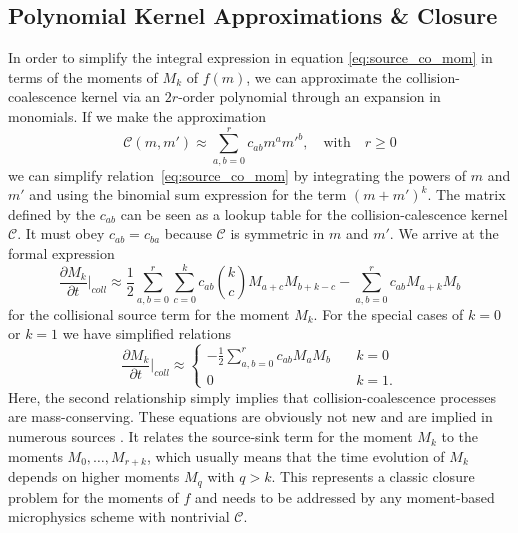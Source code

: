\documentclass{report}
\begin{document}
\subsection{Polynomial Kernel Approximations \& Closure}
In order to simplify the integral expression in equation \eqref{eq:source_co_mom} in terms of the moments of $M_k$ of $f(m)$, we can approximate the collision-coalescence kernel via an $2r$-order polynomial through an expansion in monomials. If we make the approximation
\begin{equation}
    \mathcal{C}(m,m') \approx \sum_{a,b=0}^{r} c_{ab} m^a{m'}^b, \quad \text{with} \quad r \geq 0
\label{eq:dist_approx}
\end{equation} 
we can simplify relation~\eqref{eq:source_co_mom} by integrating the powers of $m$ and $m'$ and using the binomial sum expression for the term $(m+m')^k$. The matrix defined by the $c_{ab}$ can be seen as a lookup table for the collision-calescence kernel $\mathcal{C}$. It must obey $c_{ab} = c_{ba}$ because $\mathcal{C}$ is symmetric in $m$ and $m'$. We arrive at the formal expression
\begin{equation}
\frac{\partial M_k}{\partial t} \biggr\rvert_{coll} \approx
    \frac{1}{2} \sum_{a,b=0}^{r} \sum_{c=0}^k c_{ab} {k \choose c} M_{a+c} M_{b+k-c} - \sum_{a,b=0}^{r} c_{ab} M_{a+k} M_b
\label{eq:source_co_mom_approx}
\end{equation}
for the collisional source term for the moment $M_k$. For the special cases of $k=0$ or $k=1$ we have simplified relations
\begin{equation}
    \frac{\partial M_k}{\partial t} \biggr\rvert_{coll} \approx
    \begin{cases}
    -\frac{1}{2} \sum_{a,b=0}^{r} c_{ab} M_a M_b & \quad k=0\\
    0 & \quad k = 1.
    \end{cases}
\end{equation}
Here, the second relationship simply implies that collision-coalescence processes are mass-conserving. These equations are obviously not new and are implied in numerous sources \citep[cf.][]{Pruppracher78, Beheng01}. It relates the source-sink term for the moment $M_k$ to the moments $M_0, \dots, M_{r+k}$, which usually means that the time evolution of $M_k$ depends on higher moments $M_q$ with $q>k$. This represents a classic closure problem for the moments of $f$ and needs to be addressed by any moment-based microphysics scheme with nontrivial $\mathcal{C}$.
\end{document}
